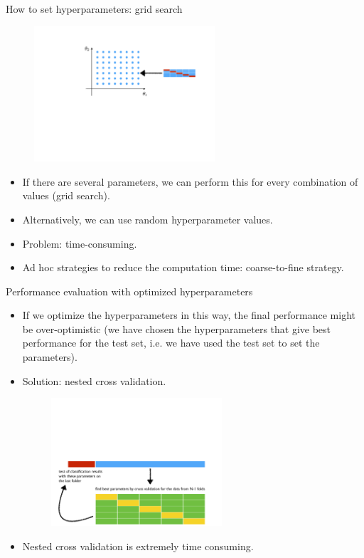 \documentclass[xcolor=pdftex,dvipsnames,table]{beamer}
\begin{document}
\begin{frame}{How to set hyperparameters: grid search}
	\begin{figure}[htb]
		\includegraphics[width=0.6\textwidth]{../graphics/CV2.pdf}
	\end{figure}
	\begin{itemize}
		\item If there are several parameters, we can perform this for every combination of values (grid search). 
		\item Alternatively, we can use random hyperparameter values. 
		\item Problem: time-consuming.
		\item Ad hoc strategies to reduce the computation time: coarse-to-fine strategy.
	\end{itemize}
\end{frame}

\begin{frame}{Performance evaluation with optimized hyperparameters}
	\begin{itemize}
		\item<1-> If we optimize the hyperparameters in this way, the final performance might be over-optimistic (we have chosen the hyperparameters that give best performance for the test set, i.e. we have used the test set to set the parameters). 
		\item<2-> Solution: nested cross validation.
		\begin{figure}[htb]
			\includegraphics[width=0.6\textwidth]{../graphics/CV3.pdf}
		\end{figure}
		\item<3-> Nested cross validation is extremely time consuming.
	\end{itemize}
\end{frame}
\end{document}
